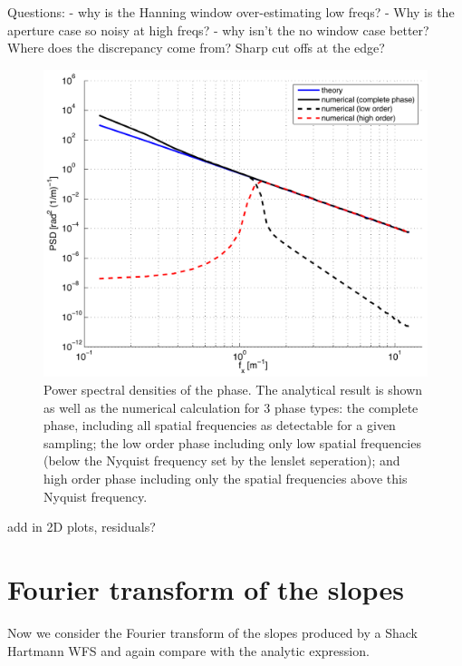 \documentclass[pdf]{note}
\begin{document}
Questions:
- why is the Hanning window over-estimating low freqs?
- Why is the aperture case so noisy at high freqs?
- why isn't the no window case better?  Where does the discrepancy come from?  Sharp cut offs
at the edge? 



\begin{figure}[htbp]
    \centerline{
      \includegraphics[scale=.6]{plots/phase_PSDs2}
    }
    \caption{Power spectral densities of the phase.  The analytical result is shown
    		as well as the numerical calculation for 3 phase types: the complete phase,
		including all spatial frequencies as detectable for a given sampling; the low
		order phase including only low spatial frequencies (below the Nyquist frequency
		set by the lenslet seperation); and high order phase including only the spatial
		frequencies above this Nyquist frequency.
    }
    \label{fig:phasePSD2}
\end{figure}


add in 2D plots, residuals?

\section{Fourier transform of the slopes}

Now we consider the Fourier transform of the slopes produced by a Shack Hartmann
WFS and again compare with the analytic expression.

\end{document}

